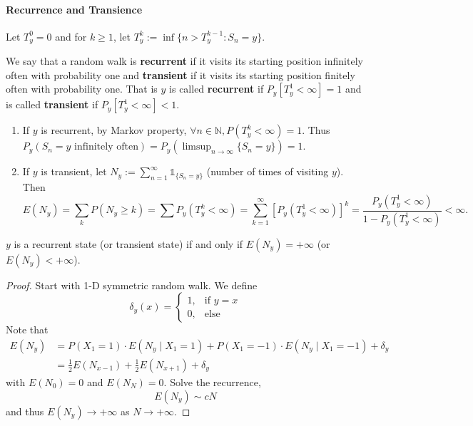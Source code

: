 \documentclass[11pt,singlecolumn, openany, citestyle=authoryear]{elegantbook}
\begin{document}
\begin{CJK}{UTF8}{gbsn}
\paragraph*{Recurrence and Transience}
Let $T_y^0=0$ and for $k\geqslant 1$, let 
$T_y^k := \inf\{n>T_y^{k-1}:S_n=y\}$.
\begin{definition}
    We say that a random walk is \textbf{recurrent}
    if it visits its starting position infinitely often with probability one and
    \textbf{transient} if it visits
    its starting position finitely often with probability one. That is 
    $y$ is called \textbf{recurrent} if $P_y[T_y^1<\infty] = 1$ and is called 
    \textbf{transient} if $P_y[T_y^1<\infty] < 1$.
\end{definition}
\begin{remark}
    \begin{enumerate}
        \item If $y$ is recurrent, by Markov property, 
        $\forall n\in \mathbb{N}, P(T_y^k<\infty)=1$. Thus 
        $P_y(S_n = y\text{ infinitely often})=P_y (\limsup_{n\to\infty} 
        \{S_n=y\})=1$.
        \item If $y$ is transient, let $N_y:=\displaystyle \sum_{n=1}^\infty
        \mathds{1}_{\{S_n=y\}}$ (number of times of visiting $y$). Then
        $$
        E(N_y)=\sum_k P(N_y\geqslant k)=\sum P_y(T_y^k <\infty) = 
        \sum_{k=1}^\infty [P_y (T_y^1<\infty)]^k= \frac{P_y(T_y^1<\infty)}{1-P_y(T_y^1<\infty)}
        <\infty.
        $$
    \end{enumerate}
\end{remark}
\begin{theorem}
    $y$ is a recurrent state (or transient state) if and only if $E(N_y)=+\infty$ (or 
    $E(N_y)<+\infty$).
\end{theorem}
\begin{proof}
Start with 1-D symmetric random walk. We define
$$
\delta_y(x)=
\begin{cases}
    1, &\text{if } y =x \\
    0, &\text{else}
\end{cases}
$$
Note that 
\begin{align*}
E(N_y)&=P(X_1=1)\cdot E(N_y \mid X_1 =1)+P(X_1=-1)\cdot E(N_y\mid X_1 = -1)+\delta_y \\
&= \frac{1}{2}E(N_{x-1})+\frac{1}{2}E(N_{x+1})+\delta_y 
\end{align*}
with $E(N_0)=0$ and $E(N_N)=0$.
Solve the recurrence, 
$$
E(N_y) \sim cN
$$
and thus $E(N_y)\to+\infty$ as $N\to +\infty$.


\end{proof}
\end{CJK}
\end{document}
